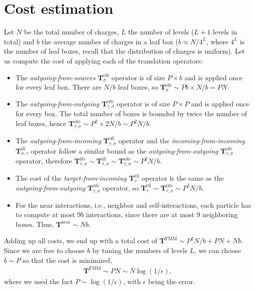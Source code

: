 \documentclass[final,onefignum,onetabnum]{siamart220329}
\newcommand{\Tbf}{\mathbf{T}}
\begin{document}
\section{Cost estimation}
Let $N$ be the total number of charges, $L$ the number of levels ($L+1$ levels in total) and $b$ the average number of charges in a leaf box ($b \approx N/4^L$, where $4^L$ is the number of leaf boxes, recall that the distribution of charges is uniform). Let us compute the cost of applying each of the translation operators:
\begin{itemize}
	\item The \textit{outgoing-from-sources} $\Tbf_{\sigma}^\text{ofs}$ operator is of size $P\times b$ and is applied once for every leaf box. There are $N/b$ leaf boxes, so $\Tbf_{\sigma}^\text{ofs}\sim Pb\times N/b = PN $.
	\item The \textit{outgoing-from-outgoing} $\Tbf_{\tau,\sigma}^\text{ofo}$ operator is of size $P\times P$ and is applied once for every box. The total number of boxes is bounded by twice the number of leaf boxes, hence $\Tbf_{\tau,\sigma}^\text{ofo}\sim P^2\times 2N/b \sim P^2N/b$.
	\item The \textit{outgoing-from-incoming} $\Tbf_{\tau,\sigma}^\text{ofi}$ operator and the \textit{incoming-from-incoming} $\Tbf_{\sigma,\tau}^\text{ifi}$ operator follow a similar bound as the \textit{outgoing-from-outgoing} $\Tbf_{\tau,\sigma}^\text{ofo}$ operator, therefore $\Tbf_{\tau,\sigma}^\text{ifo}\sim \Tbf_{\tau,\sigma}^\text{ifi}\sim\Tbf_{\tau,\sigma}^\text{ofo} \sim P^2N/b$.
	\item The cost of the \textit{target-from-incoming} $\Tbf_{\tau}^\text{tfi}$ operator is the same as the \textit{outgoing-from-outgoing} $\Tbf_{\tau,\sigma}^\text{ofo}$ operator, so $\Tbf_{\tau}^\text{tfi}\sim\Tbf_{\tau,\sigma}^\text{ofo}\sim P^2N/b$.
	\item For the near interactions, i.e., neighbor and self-interactions, each particle has to compute at most $9b$ interactions, since there are at most $9$ neighboring boxes. Thus, $\Tbf^\text{near}\sim Nb$.
\end{itemize}
Adding up all costs, we end up with a total cost of $\Tbf^\text{FMM}\sim P^2N/b + PN + Nb$. Since we are free to choose $b$ by tuning the numbers of levels $L$, we can choose $b\sim P$ so that the cost is minimized, 
\begin{align}
	\Tbf^\text{FMM}\sim PN \sim N\log(1/\epsilon),
\end{align}
where we used the fact $P \sim \log(1/\epsilon)$, with $\epsilon$ being the error.
\end{document}
